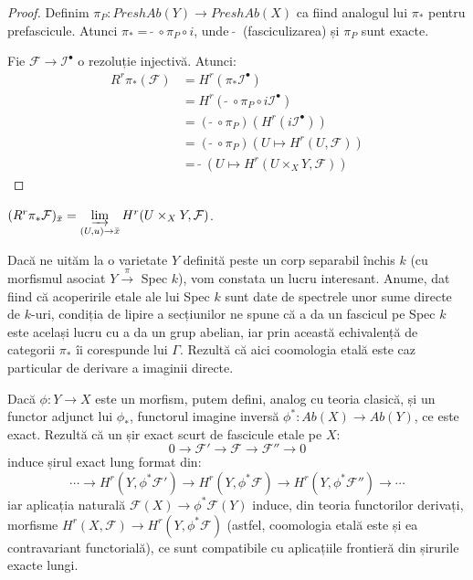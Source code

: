 \documentclass[13pt,openany]{book}
\begin{document}
\begin{proof}
Definim $\pi_P: PreshAb(Y) \rightarrow PreshAb(X)$ ca fiind analogul lui $\pi_*$ pentru prefascicule. Atunci $\pi_* =\  \widetilde{}\ \circ \pi_P \circ i$, unde $\ \widetilde{}\ $ (fasciculizarea) și $\pi_P$ sunt exacte.

Fie $\mathcal{F} \rightarrow \mathcal{I}^\bullet$ o rezoluție injectivă. Atunci:
\begin{align*}
R^r\pi_*(\mathcal{F}) &= H^r(\pi_*\mathcal{I}^\bullet)\\
&= H^r (\ \widetilde{}\ \circ \pi_P \circ i\mathcal{I}^\bullet)\\
&= (\ \widetilde{}\ \circ \pi_P)(H^r(i\mathcal{I}^\bullet))\\
&=(\ \widetilde{}\ \circ \pi_P)(U \mapsto H^r(U, \mathcal{F}))\\
&=\ \widetilde{}\ (U \mapsto H^r(U \times_X Y, \mathcal{F}))
\end{align*}
\end{proof}

\begin{cor}
$(R^r\pi_*\mathcal{F})_{\bar{x}} = \varinjlim\limits_{(U,u) \rightarrow \bar{x}} H^r(U \times_X Y, \mathcal{F})$.
\end{cor}

Dacă ne uităm la o varietate $Y$ definită peste un corp separabil închis $k$ (cu morfismul asociat $Y \xrightarrow{\pi}$ Spec $k$), vom constata un lucru interesant. Anume, dat fiind că acoperirile etale ale lui Spec $k$ sunt date de spectrele unor sume directe de $k$-uri, condiția de lipire a secțiunilor ne spune că a da un fascicul pe Spec $k$ este același lucru cu a da un grup abelian, iar prin această echivalență de categorii $\pi_*$ îi corespunde lui $\Gamma$. Rezultă că aici coomologia etală este caz particular de derivare a imaginii directe.

Dacă $\phi:Y \rightarrow X$ este un morfism, putem defini, analog cu teoria clasică, și un functor adjunct lui $\phi_*$, functorul imagine inversă $\phi^* : Ab(X) \rightarrow Ab(Y)$, ce este exact. Rezultă că un șir exact scurt de fascicule etale pe $X$:
$$0 \rightarrow \mathcal{F}' \rightarrow \mathcal{F} \rightarrow \mathcal{F}'' \rightarrow 0$$
induce șirul exact lung format din:
$$\cdots \rightarrow H^r(Y,\phi^*\mathcal{F}') \rightarrow H^r(Y,\phi^*\mathcal{F}) \rightarrow H^r(Y,\phi^*\mathcal{F}'') \rightarrow \cdots$$
iar aplicația naturală $\mathcal{F}(X) \rightarrow \phi^*\mathcal{F}(Y)$ induce, din teoria functorilor derivați, morfisme $H^r(X,\mathcal{F}) \rightarrow H^r(Y,\phi^*\mathcal{F})$ (astfel, coomologia etală este și ea contravariant functorială), ce sunt compatibile cu aplicațiile frontieră din șirurile exacte lungi.
\end{document}
